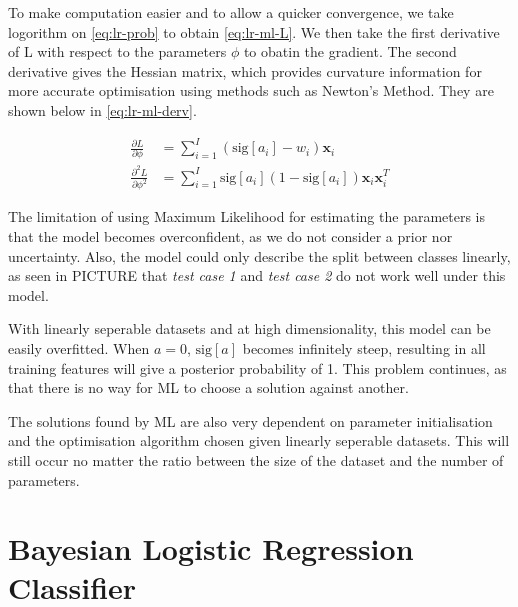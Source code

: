\documentclass[11pt,openright,a4paper]{article}
\numberwithin{equation}{section}
\begin{document}
To make computation easier and to allow a quicker convergence, we take logorithm on \autoref{eq:lr-prob} to obtain \autoref{eq:lr-ml-L}. We then take the first derivative of L with respect to the parameters $\phi$ to obatin the gradient. The second derivative gives the Hessian matrix, which provides curvature information for more accurate optimisation using methods such as Newton's Method. They are shown below in \autoref{eq:lr-ml-derv}.

\begin{equation} \label{eq:lr-ml-derv}
    \begin{aligned}
        \frac{\partial L}{\partial \phi} &= 
            \sum_{i=1}^{I} \left ( \text{sig} \left [ a_i  \right ] - w_i \right ) \mathbf{x}_i
        \\
        \frac{\partial^2 L}{\partial \phi^2} &=
            \sum_{i=1}^{I} \text{sig} \left [ a_i  \right ] 
                \left ( 1 - \text{sig} \left [ a_i  \right ] \right ) 
                \mathbf{x}_i \mathbf{x}_i^{T}
    \end{aligned}
\end{equation}


The limitation of using Maximum Likelihood for estimating the parameters is that the model becomes overconfident, as we do not consider a prior nor uncertainty. Also, the model could only describe the split between classes linearly, as seen in PICTURE that \textit{test case 1} and \textit{test case 2} do not work well under this model.

With linearly seperable datasets and at high dimensionality, this model can be easily overfitted. When $a = 0$, $\text{sig} [a]$ becomes infinitely steep, resulting in all training features will give a posterior probability of 1. This problem continues, as that there is no way for ML to choose a solution against another.


The solutions found by ML are also very dependent on parameter initialisation and the optimisation algorithm chosen given linearly seperable datasets. This will still occur no matter the ratio between the size of the dataset and the number of parameters.


\section{Bayesian Logistic Regression Classifier} \label{sec:nonlr}
\end{document}
